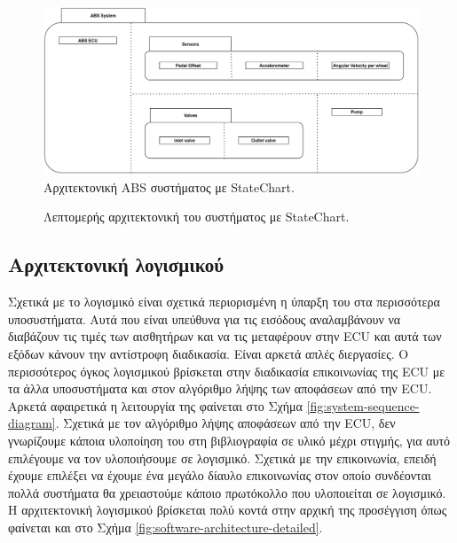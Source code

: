 \documentclass{article}
\begin{document}
\begin{figure}[h]
    \begin{center}
    \includegraphics[scale=0.15]{images/system-architecture-overview.png}
    \end{center}
    \caption{Αρχιτεκτονική ABS συστήματος με StateChart.}
    \label{fig:system-architecture-overview}
\end{figure}

\begin{figure}[Η]
    \caption{Λεπτομερής αρχιτεκτονική του συστήματος με StateChart.}
    \label{fig:system-architecture-detailed}
\end{figure}

\subsection{Αρχιτεκτονική λογισμικού}
Σχετικά με το λογισμικό είναι σχετικά περιορισμένη η ύπαρξη του στα περισσότερα υποσυστήματα. Αυτά που είναι υπεύθυνα για τις εισόδους αναλαμβάνουν να διαβάζουν τις τιμές των αισθητήρων και να τις μεταφέρουν στην ECU και αυτά των εξόδων κάνουν την αντίστροφη διαδικασία. Είναι αρκετά απλές διεργασίες. Ο περισσότερος όγκος λογισμικού βρίσκεται στην διαδικασία επικοινωνίας της ECU με τα άλλα υποσυστήματα και στον αλγόριθμο λήψης των αποφάσεων από την ECU. Αρκετά αφαιρετικά η λειτουργία της φαίνεται στο Σχήμα \ref{fig:system-sequence-diagram}. Σχετικά με τον αλγόριθμο λήψης αποφάσεων από την ECU, δεν γνωρίζουμε κάποια υλοποίηση του στη βιβλιογραφία σε υλικό μέχρι στιγμής, για αυτό επιλέγουμε να τον υλοποιήσουμε σε λογισμικό. Σχετικά με την επικοινωνία, επειδή έχουμε επιλέξει να έχουμε ένα μεγάλο δίαυλο επικοινωνίας στον οποίο συνδέονται πολλά συστήματα θα χρειαστούμε κάποιο πρωτόκολλο που υλοποιείται σε λογισμικό. Η αρχιτεκτονική λογισμικού βρίσκεται πολύ κοντά στην αρχική της προσέγγιση όπως φαίνεται και στο Σχήμα \ref{fig:software-architecture-detailed}.
\end{document}
